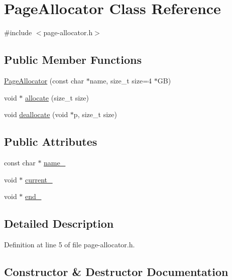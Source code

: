 \hypertarget{class_page_allocator}{}\section{Page\+Allocator Class Reference}
\label{class_page_allocator}


{\ttfamily \#include $<$page-\/allocator.\+h$>$}

\subsection*{Public Member Functions}
\begin{DoxyCompactItemize}
\item 
\mbox{\hyperlink{class_page_allocator_a4a17992fdc7a59fa9bbc01d38a9dd553}{Page\+Allocator}} (const char $\ast$name, size\+\_\+t size=4 $\ast$GB)
\item 
void $\ast$ \mbox{\hyperlink{class_page_allocator_aace2770352e13422515c4fa2dbdadd50}{allocate}} (size\+\_\+t size)
\item 
void \mbox{\hyperlink{class_page_allocator_ae3c05b01e61a8b5d3d18bde2a16dc7ab}{deallocate}} (void $\ast$p, size\+\_\+t size)
\end{DoxyCompactItemize}
\subsection*{Public Attributes}
\begin{DoxyCompactItemize}
\item 
const char $\ast$ \mbox{\hyperlink{class_page_allocator_a7a7310605c23e3cfb79a76f80c8fd340}{name\+\_\+}}
\item 
void $\ast$ \mbox{\hyperlink{class_page_allocator_a312706b7610cb7c5eca8f31fa79d1cf7}{current\+\_\+}}
\item 
void $\ast$ \mbox{\hyperlink{class_page_allocator_a9bdba46b98f1df0649f44f5ba8c98289}{end\+\_\+}}
\end{DoxyCompactItemize}


\subsection{Detailed Description}


Definition at line 5 of file page-\/allocator.\+h.



\subsection{Constructor \& Destructor Documentation}
\mbox{\label{class_page_allocator_a4a17992fdc7a59fa9bbc01d38a9dd553}} 
